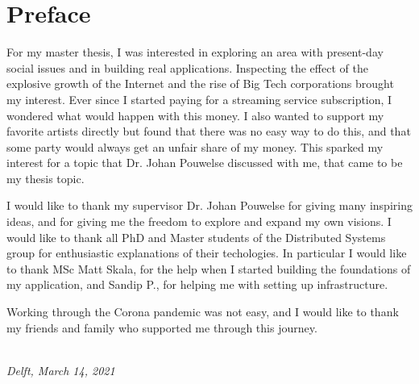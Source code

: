 \chapter*{Preface}

For my master thesis, I was interested in exploring an area with present-day social issues and in building real applications. Inspecting the effect of the explosive growth of the Internet and the rise of Big Tech corporations brought my interest. Ever since I started paying for a streaming service subscription, I wondered what would happen with this money. I also wanted to support my favorite artists directly but found that there was no easy way to do this, and that some party would always get an unfair share of my money. This sparked my interest for a topic that Dr. Johan Pouwelse discussed with me, that came to be my thesis topic.

I would like to thank my supervisor Dr. Johan Pouwelse for giving many inspiring ideas, and for giving me the freedom to explore and expand my own visions. I would like to thank all PhD and Master students of the Distributed Systems group for enthusiastic explanations of their techologies. In particular I would like to thank MSc Matt Skala, for the help when I started building the foundations of my application, and Sandip P., for helping me with setting up infrastructure.

Working through the Corona pandemic was not easy, and I would like to thank my friends and family who supported me through this journey.

\begin{flushright}
{\makeatletter\itshape
    \@author \\
    Delft, March 14, 2021
\makeatother}
\end{flushright}

